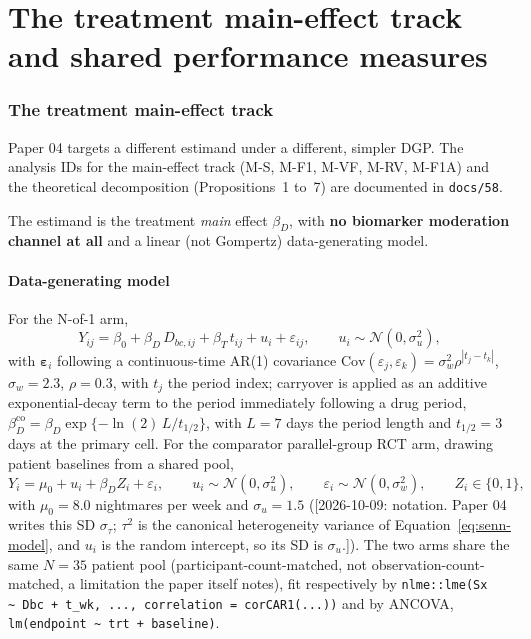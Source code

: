 \documentclass[11pt]{article}
\newcommand{\note}[1]{\textcolor{blue!60!black}{\small [#1]}}
\newcommand{\code}[1]{\texttt{#1}}
\begin{document}
\part{The treatment main-effect track and shared performance measures}

\section{The treatment main-effect track}
\label{sec:maineffect}

Paper 04 targets a different estimand under a different, simpler DGP.
The analysis IDs for the main-effect track (M-S, M-F1, M-VF, M-RV,
M-F1A) and the theoretical decomposition (Propositions~1 to~7) are
documented in \code{docs/58}.

The estimand is the treatment \emph{main} effect $\beta_D$, with
\textbf{no biomarker moderation channel at all} and a linear (not
Gompertz) data-generating model.

\subsection{Data-generating model}

For the N-of-1 arm,
\begin{equation}
Y_{ij} = \beta_0 + \beta_D\, D_{bc,ij} + \beta_T\, t_{ij} + u_i +
  \varepsilon_{ij}, \qquad u_i \sim \mathcal N(0,\sigma_u^2),
\label{eq:me-nof1}
\end{equation}
with $\boldsymbol\varepsilon_i$ following a continuous-time AR(1)
covariance $\mathrm{Cov}(\varepsilon_j,\varepsilon_k) = \sigma_w^2
\rho^{|t_j-t_k|}$, $\sigma_w = 2.3$, $\rho = 0.3$, with $t_j$ the period
index; carryover is applied as an additive exponential-decay term to
the period immediately following a drug period,
$\beta_D^{\mathrm{co}} = \beta_D \exp\{-\ln(2)\,L/t_{1/2}\}$, with $L
= 7$ days the period length and $t_{1/2} = 3$ days at the primary cell.
For the comparator parallel-group RCT arm, drawing patient baselines
from a shared pool,
\begin{equation}
Y_i = \mu_0 + u_i + \beta_D Z_i + \varepsilon_i, \qquad u_i \sim
  \mathcal N(0, \sigma_u^2), \qquad \varepsilon_i \sim \mathcal N(0, \sigma_w^2),
  \qquad Z_i \in \{0,1\},
\label{eq:me-rct}
\end{equation}
with $\mu_0 = 8.0$ nightmares per week and $\sigma_u = 1.5$
(\note{2026-10-09: notation. Paper 04 writes this SD $\sigma_\tau$;
$\tau^2$ is the canonical heterogeneity variance of
Equation~\eqref{eq:senn-model}, and $u_i$ is the random intercept, so
its SD is $\sigma_u$.}). The
two arms share the same $N=35$ patient pool (participant-count-matched,
not observation-count-matched, a limitation the paper itself notes),
fit respectively by \code{nlme::lme(Sx \textasciitilde\ Dbc + t\_wk,
..., correlation = corCAR1(...))} and by ANCOVA, \code{lm(endpoint
\textasciitilde\ trt + baseline)}.
\end{document}
